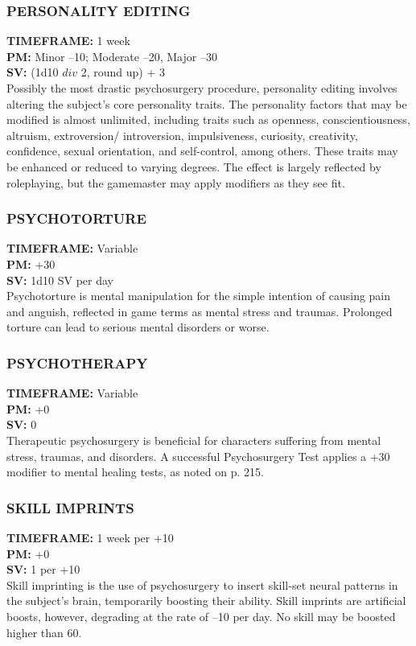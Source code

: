 \subsubsection{PERSONALITY EDITING}
\textbf{TIMEFRAME:} 1 week \\
\textbf{PM:} Minor –10; Moderate –20, Major –30 \\
\textbf{SV:} (1d10 $div$ 2, round up) + 3 \\
Possibly the most drastic psychosurgery procedure,
personality editing involves altering the subject’s core
personality traits. The personality factors that may be
modified is almost unlimited, including traits such as
openness, conscientiousness, altruism, extroversion/
introversion, impulsiveness, curiosity, creativity, confidence, sexual orientation, and self-control, among
others. These traits may be enhanced or reduced to
varying degrees. The effect is largely reflected by roleplaying,
but the gamemaster may apply modifiers as
they see fit.

\subsubsection{PSYCHOTORTURE}
\textbf{TIMEFRAME:} Variable \\
\textbf{PM:} +30 \\
\textbf{SV:} 1d10 SV per day \\
Psychotorture is mental manipulation for the simple
intention of causing pain and anguish, reflected in
game terms as mental stress and traumas. Prolonged
torture can lead to serious mental disorders or worse.

\subsubsection{PSYCHOTHERAPY}
\textbf{TIMEFRAME:} Variable \\
\textbf{PM:} +0 \\
\textbf{SV:} 0 \\
Therapeutic psychosurgery is beneficial for characters
suffering from mental stress, traumas, and disorders. A
successful Psychosurgery Test applies a +30 modifier
to mental healing tests, as noted on p. 215.

\subsubsection{SKILL IMPRINTS}
\textbf{TIMEFRAME:} 1 week per +10 \\
\textbf{PM:} +0 \\
\textbf{SV:} 1 per +10 \\
Skill imprinting is the use of psychosurgery to insert
skill-set neural patterns in the subject’s brain, temporarily
boosting their ability. Skill imprints are artificial
boosts, however, degrading at the rate of –10 per day.
No skill may be boosted higher than 60.

